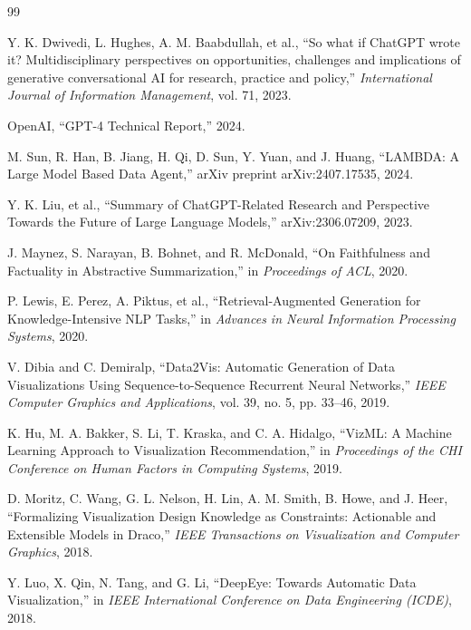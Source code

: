 \documentclass[12pt,a4paper,openany]{report}
\begin{document}
\clearpage
{}
{}
\begin{thebibliography}{99}

 Y. K. Dwivedi, L. Hughes, A. M. Baabdullah, et al., ``So what if ChatGPT wrote it? Multidisciplinary perspectives on opportunities, challenges and implications of generative conversational AI for research, practice and policy,'' \textit{International Journal of Information Management}, vol. 71, 2023.

 OpenAI, ``GPT-4 Technical Report,'' 2024.

 M. Sun, R. Han, B. Jiang, H. Qi, D. Sun, Y. Yuan, and J. Huang, ``LAMBDA: A Large Model Based Data Agent,'' arXiv preprint arXiv:2407.17535, 2024.

 Y. K. Liu, et al., ``Summary of ChatGPT-Related Research and Perspective Towards the Future of Large Language Models,'' arXiv:2306.07209, 2023.

 J. Maynez, S. Narayan, B. Bohnet, and R. McDonald, ``On Faithfulness and Factuality in Abstractive Summarization,'' in \textit{Proceedings of ACL}, 2020.

 P. Lewis, E. Perez, A. Piktus, et al., ``Retrieval-Augmented Generation for Knowledge-Intensive NLP Tasks,'' in \textit{Advances in Neural Information Processing Systems}, 2020.

 V. Dibia and C. Demiralp, ``Data2Vis: Automatic Generation of Data Visualizations Using Sequence-to-Sequence Recurrent Neural Networks,'' \textit{IEEE Computer Graphics and Applications}, vol. 39, no. 5, pp. 33--46, 2019.

 K. Hu, M. A. Bakker, S. Li, T. Kraska, and C. A. Hidalgo, ``VizML: A Machine Learning Approach to Visualization Recommendation,'' in \textit{Proceedings of the CHI Conference on Human Factors in Computing Systems}, 2019.

 D. Moritz, C. Wang, G. L. Nelson, H. Lin, A. M. Smith, B. Howe, and J. Heer, ``Formalizing Visualization Design Knowledge as Constraints: Actionable and Extensible Models in Draco,'' \textit{IEEE Transactions on Visualization and Computer Graphics}, 2018.

 Y. Luo, X. Qin, N. Tang, and G. Li, ``DeepEye: Towards Automatic Data Visualization,'' in \textit{IEEE International Conference on Data Engineering (ICDE)}, 2018.


\end{thebibliography}
\end{document}
